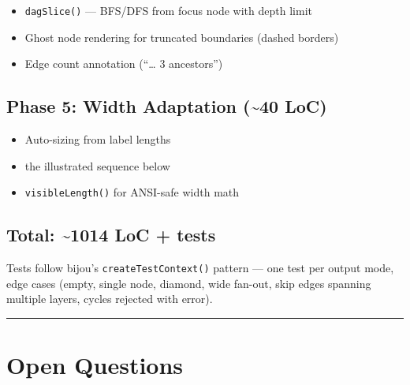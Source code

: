 \begin{itemize}
\tightlist
\item
  \texttt{d\allowbreak{}a\allowbreak{}g\allowbreak{}S\allowbreak{}l\allowbreak{}i\allowbreak{}c\allowbreak{}e\allowbreak{}(\allowbreak{})} --- BFS/DFS from focus node with depth limit
\item
  Ghost node rendering for truncated boundaries (dashed borders)
\item
  Edge count annotation (``\ldots{} 3 ancestors'')
\end{itemize}

\subsection{Phase 5: Width Adaptation (\textasciitilde40 LoC)}\label{record-426-phase-5-width-adaptation-40-loc}

\begin{itemize}
\tightlist
\item
  Auto-sizing from label lengths
\item
  the illustrated sequence below
\item
  \texttt{v\allowbreak{}i\allowbreak{}s\allowbreak{}i\allowbreak{}b\allowbreak{}l\allowbreak{}e\allowbreak{}L\allowbreak{}e\allowbreak{}n\allowbreak{}g\allowbreak{}t\allowbreak{}h\allowbreak{}(\allowbreak{})} for ANSI-safe width math
\end{itemize}



\subsection{Total: \textasciitilde1014 LoC + tests}\label{record-426-total-1014-loc-tests}

Tests follow bijou's \texttt{c\allowbreak{}r\allowbreak{}e\allowbreak{}a\allowbreak{}t\allowbreak{}e\allowbreak{}T\allowbreak{}e\allowbreak{}s\allowbreak{}t\allowbreak{}C\allowbreak{}o\allowbreak{}n\allowbreak{}t\allowbreak{}e\allowbreak{}x\allowbreak{}t\allowbreak{}(\allowbreak{})} pattern --- one test per output mode, edge cases (empty, single node, diamond, wide fan-out, skip edges spanning multiple layers, cycles rejected with error).

\begin{center}\rule{0.5\linewidth}{0.5pt}\end{center}

\section{Open Questions}\label{record-426-open-questions}

